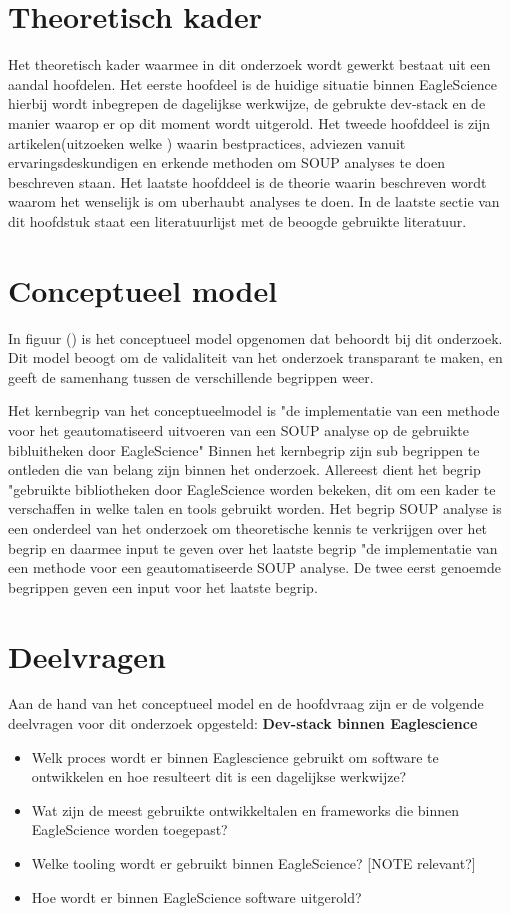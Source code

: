 \section{Theoretisch kader}\label{sec:theoretisch-kader}
Het theoretisch kader waarmee in dit onderzoek wordt gewerkt bestaat uit een aandal hoofdelen. Het eerste hoofdeel is de huidige situatie binnen EagleScience hierbij wordt inbegrepen de dagelijkse werkwijze, de gebrukte dev-stack en de manier waarop er op dit moment wordt uitgerold. Het tweede hoofddeel is zijn artikelen(uitzoeken welke ) waarin bestpractices, adviezen vanuit ervaringsdeskundigen en erkende methoden om SOUP analyses te doen beschreven staan. Het laatste hoofddeel is de theorie waarin beschreven wordt waarom het wenselijk is om uberhaubt analyses te doen. In de laatste sectie van dit hoofdstuk staat een literatuurlijst met de beoogde gebruikte literatuur.


\section{Conceptueel model}\label{sec:conceptueel-model}
In figuur () is het conceptueel model opgenomen dat behoordt bij dit onderzoek. Dit model beoogt om de validaliteit van het onderzoek transparant te maken, en geeft de samenhang tussen de verschillende begrippen weer.

Het kernbegrip van het conceptueelmodel is "de implementatie van een methode voor het geautomatiseerd uitvoeren van een SOUP analyse op de gebruikte bibluitheken door EagleScience" Binnen het kernbegrip zijn sub begrippen te ontleden die van belang zijn binnen het onderzoek. Allereest dient het begrip "gebruikte bibliotheken door EagleScience worden bekeken, dit om een kader te verschaffen in welke talen en tools gebruikt worden. Het begrip SOUP analyse is een onderdeel van het onderzoek om theoretische kennis te verkrijgen over het begrip en daarmee input te geven over het laatste begrip "de implementatie van een methode voor een geautomatiseerde SOUP analyse. De twee eerst genoemde begrippen geven een input voor het laatste begrip.


\section{Deelvragen}\label{sec:deelvragen}
Aan de hand van het conceptueel model en de hoofdvraag zijn er de volgende deelvragen voor dit onderzoek opgesteld:
\textbf{Dev-stack binnen Eaglescience}
\begin{itemize}
    \item Welk proces wordt er binnen Eaglescience gebruikt om software te ontwikkelen en hoe resulteert dit is een dagelijkse werkwijze?
    \item Wat zijn de meest gebruikte ontwikkeltalen en frameworks die binnen EagleScience worden toegepast?
    \item Welke tooling wordt er gebruikt binnen EagleScience? [NOTE relevant?]
    \item Hoe wordt er binnen EagleScience software uitgerold?
\end{itemize}

